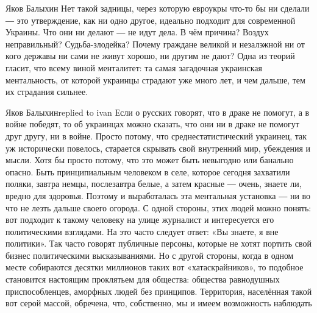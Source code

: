  
 
 
 
 


Яков Балыхин
Нет такой задницы, через которую евроукры что-то бы ни сделали ― это утверждение, как ни одно другое, идеально подходит для современной Украины. Что они ни делают ― не идут дела. В чём причина? Воздух неправильный? Судьба-злодейка? Почему граждане великой и незалэжной ни от кого державы ни сами не живут хорошо, ни другим не дают? Одна из теорий гласит, что всему виной менталитет: та самая загадочная украинская ментальность, от которой украинцы страдают уже много лет, и чем дальше, тем их страдания сильнее.

Яков Балыхинreplied to ivan
Если о русских говорят, что в драке не помогут, а в войне победят, то об украинцах можно сказать, что они ни в драке не помогут друг другу, ни в войне. Просто потому, что среднестатистический украинец, так уж исторически повелось, старается скрывать свой внутренний мир, убеждения и мысли. Хотя бы просто потому, что это может быть невыгодно или банально опасно. Быть принципиальным человеком в селе, которое сегодня захватили поляки, завтра немцы, послезавтра белые, а затем красные ― очень, знаете ли, вредно для здоровья. Поэтому и выработалась эта ментальная установка ― ни во что не лезть дальше своего огорода. С одной стороны, этих людей можно понять: вот подходит к такому человеку на улице журналист и интересуется его политическими взглядами. На это часто следует ответ: «Вы знаете, я вне политики». Так часто говорят публичные персоны, которые не хотят портить свой бизнес политическими высказываниями. Но с другой стороны, когда в одном месте собираются десятки миллионов таких вот «хатаскрайников», то подобное становится настоящим проклятьем для общества: общества равнодушных приспособленцев, аморфных людей без принципов. Территория, населённая такой вот серой массой, обречена, что, собственно, мы и имеем возможность наблюдать

